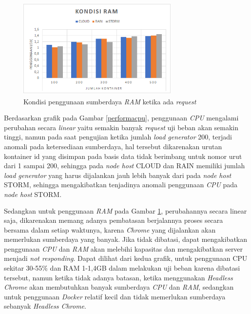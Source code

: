 				\begin{figure}[H]
					\centering
					\includegraphics[width=8cm,height=5cm]{Images/C-5/performaram.png}
					\caption{Kondisi penggunaan sumberdaya \textit{RAM} ketika ada \textit{request}}
					\label{performaram}
				\end{figure}
			
				Berdasarkan grafik pada Gambar \ref{performacpu}, penggunaan \textit{CPU} mengalami perubahan secara \textit{linear} yaitu semakin banyak \textit{request} uji beban akan semakin tinggi, namun pada saat pengujian ketika jumlah \textit{load generator} 200, terjadi anomali pada ketersediaan sumberdaya, hal tersebut dikarenakan urutan kontainer id yang disimpan pada basis data tidak berimbang untuk nomor urut dari 1 sampai 200, sehingga pada \textit{node host} CLOUD dan RAIN memiliki jumlah \textit{load generator} yang harus dijalankan jauh lebih banyak dari pada \textit{node host} STORM, sehingga mengakibatkan tenjadinya anomali penggunaan \textit{CPU} pada \textit{node host} STORM.
				
				\indent Sedangkan untuk penggunaan \textit{RAM} pada Gambar \ref{performaram}, perubahannya secara linear saja, dikarenakan memang adanya pembatasan berjalannya proses secara bersama dalam setiap waktunya, karena \textit{Chrome} yang dijalankan akan memerlukan sumberdaya yang banyak. Jika tidak dibatasi, dapat mengakibatkan penggunaan \textit{CPU} dan \textit{RAM} akan melebihi kapasitas dan mengakibatkan server menjadi \textit{not responding}. Dapat dilihat dari kedua grafik, untuk penggunaan CPU sekitar 30-55\% dan RAM 1-1,4GB dalam melakukan uji beban karena dibatasi tersebut, namun ketika tidak adanya batasan, ketika menggunakan \textit{Headless Chrome} akan membutuhkan banyak sumberdaya \textit{CPU} dan \textit{RAM}, sedangkan untuk penggunaan \textit{Docker} relatif kecil dan tidak memerlukan sumberdaya sebanyak \textit{Headless Chrome}.
				